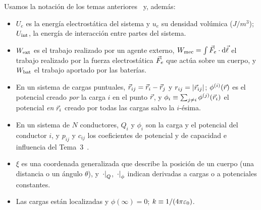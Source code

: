 \begin{notacion}\label{not:tema5}
Usamos la notación de los temas anteriores~\cite{T0,T1,T2,T3,T4} y, además:
\begin{itemize}
  \item $U_e$ es la energía electrostática del sistema y $u_e$ su densidad volúmica ($\si{J/m^3}$); $U_{\mathrm{int}}$, la energía de
        interacción entre partes del sistema.
  \item $W_{\mathrm{ext}}$ es el trabajo realizado por un agente externo, $W_{\mathrm{mec}}=\int\vec F_e\cdot\mathop{}\!\mathrm{d}\vec\ell$ el trabajo realizado por la fuerza
        electrostática $\vec F_e$ que actúa sobre un cuerpo, y $W_{\mathrm{bat}}$ el trabajo aportado por las baterías.
  \item En un sistema de cargas puntuales, $\vec r_{ij}=\vec r_i-\vec r_j$ y $r_{ij}=\left\lvert \vec r_{ij}\right\rvert$; $\phi^{(i)}(\vec r)$ es el potencial
        creado \emph{por} la carga $i$ en el punto $\vec r$, y $\phi_i\equiv\sum_{j\neq i}\phi^{(j)}(\vec r_i)$ el potencial \emph{en} $\vec r_i$ creado por todas
        las cargas salvo la $i$-ésima.
  \item En un sistema de $N$ conductores, $Q_i$ y $\phi_i$ son la carga y el potencial del conductor $i$, y $p_{ij}$ y $c_{ij}$ los
        coeficientes de potencial y de capacidad e influencia del Tema~3~\cite{T3}.
  \item $\xi$ es una coordenada generalizada que describe la posición de un cuerpo (una distancia o un ángulo $\theta$), y
        $\left.\cdot\right|_{Q}$, $\left.\cdot\right|_{\phi}$ indican derivadas a cargas o a potenciales constantes.
  \item Las cargas están localizadas y $\phi(\infty)=0$; $k\equiv1/(4\pi\varepsilon_0)$.
\end{itemize}
\end{notacion}
